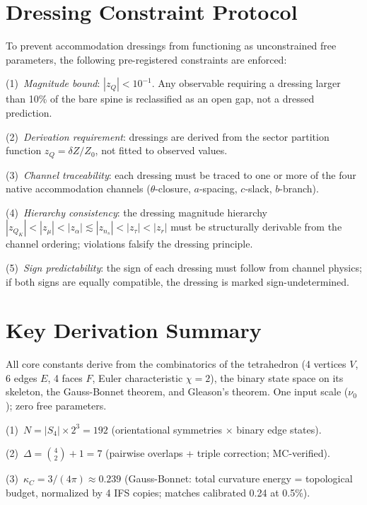 \documentclass[11pt,twocolumn]{article}
\begin{document}
\appendix

\section{Dressing Constraint Protocol}
\label{app:dressing}

To prevent accommodation dressings from functioning as unconstrained free parameters,\cite{truthcore} the following pre-registered constraints are enforced:

(1)~\emph{Magnitude bound}: $|z_Q| < 10^{-1}$.
Any observable requiring a dressing larger than 10\% of the bare spine is reclassified as an open gap, not a dressed prediction.

(2)~\emph{Derivation requirement}: dressings are derived from the sector partition function $z_Q = \delta Z / Z_0$, not fitted to observed values.

(3)~\emph{Channel traceability}: each dressing must be traced to one or more of the four native accommodation channels ($\theta$-closure, $a$-spacing, $c$-slack, $b$-branch).

(4)~\emph{Hierarchy consistency}: the dressing magnitude hierarchy $|z_{Q_K}| < |z_\mu| < |z_\alpha| \lesssim |z_{n_s}| < |z_\tau| < |z_r|$ must be structurally derivable from the channel ordering; violations falsify the dressing principle.

(5)~\emph{Sign predictability}: the sign of each dressing must follow from channel physics; if both signs are equally compatible, the dressing is marked sign-undetermined.


\section{Key Derivation Summary}
\label{app:derivations}

All core constants derive from the combinatorics of the tetrahedron (4 vertices $V$, 6 edges $E$, 4 faces $F$, Euler characteristic $\chi = 2$), the binary state space on its skeleton, the Gauss-Bonnet theorem, and Gleason's theorem.  One input scale ($\nu_0$); zero free parameters.

(1)~$N = |S_4| \times 2^3 = 192$ (orientational symmetries $\times$ binary edge states).

(2)~$\Delta = \binom{4}{2} + 1 = 7$ (pairwise overlaps + triple correction; MC-verified).

(3)~$\kappa_C = 3/(4\pi) \approx 0.239$ (Gauss-Bonnet: total curvature energy = topological budget, normalized by 4 IFS copies; matches calibrated 0.24 at 0.5\%).
\end{document}
